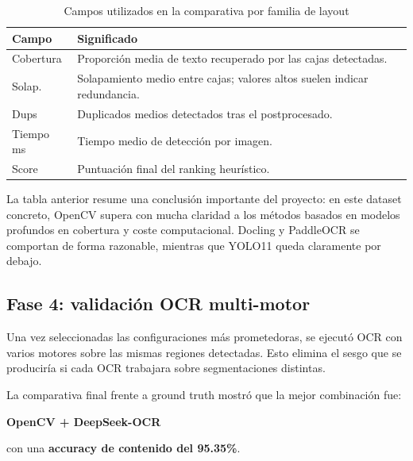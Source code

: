 \documentclass[11pt, a4paper]{article}
\begin{document}
\begin{table}[H]
\centering
\caption{Campos utilizados en la comparativa por familia de layout}
\small
\begin{tabular}{p{3.2cm} p{10.3cm}}
\toprule
\textbf{Campo} & \textbf{Significado} \\
\midrule
Cobertura & Proporci\'on media de texto recuperado por las cajas detectadas. \\
Solap. & Solapamiento medio entre cajas; valores altos suelen indicar redundancia. \\
Dups & Duplicados medios detectados tras el postprocesado. \\
Tiempo ms & Tiempo medio de detecci\'on por imagen. \\
Score & Puntuaci\'on final del ranking heur\'istico. \\
\bottomrule
\end{tabular}
\normalsize
\end{table}

La tabla anterior resume una conclusi\'on importante del proyecto: en este dataset concreto,
OpenCV supera con mucha claridad a los m\'etodos basados en modelos profundos en cobertura y
coste computacional. Docling y PaddleOCR se comportan de forma razonable, mientras que YOLO11
queda claramente por debajo.

\subsection{Fase 4: validaci\'on OCR multi-motor}

Una vez seleccionadas las configuraciones m\'as prometedoras, se ejecut\'o OCR con varios motores
sobre las mismas regiones detectadas. Esto elimina el sesgo que se producir\'ia si cada OCR
trabajara sobre segmentaciones distintas.

La comparativa final frente a ground truth mostr\'o que la mejor combinaci\'on fue:

\begin{center}
\textbf{OpenCV + DeepSeek-OCR}
\end{center}

con una \textbf{accuracy de contenido del 95.35\%}.
\end{document}
